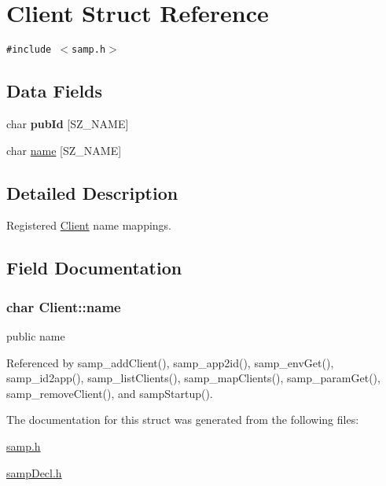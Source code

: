 \hypertarget{structClient}{
\section{Client Struct Reference}
\label{structClient}
}
{\tt \#include $<$samp.h$>$}

\subsection*{Data Fields}
\begin{CompactItemize}
\item 
\hypertarget{structClient_69ad045aad8793b0aa0984e245e549eb}{
char \textbf{pubId} \mbox{[}SZ\_\-NAME\mbox{]}}
\label{structClient_69ad045aad8793b0aa0984e245e549eb}

\item 
char \hyperlink{structClient_67f4b49f5eda3f6cf1ff33a6fe883bf6}{name} \mbox{[}SZ\_\-NAME\mbox{]}
\end{CompactItemize}


\subsection{Detailed Description}
Registered \hyperlink{structClient}{Client} name mappings. 

\subsection{Field Documentation}
\hypertarget{structClient_67f4b49f5eda3f6cf1ff33a6fe883bf6}{
\subsubsection[{name}]{\setlength{\rightskip}{0pt plus 5cm}char {\bf Client::name}}}
\label{structClient_67f4b49f5eda3f6cf1ff33a6fe883bf6}


public name 

Referenced by samp\_\-addClient(), samp\_\-app2id(), samp\_\-envGet(), samp\_\-id2app(), samp\_\-listClients(), samp\_\-mapClients(), samp\_\-paramGet(), samp\_\-removeClient(), and sampStartup().

The documentation for this struct was generated from the following files:\begin{CompactItemize}
\item 
\hyperlink{samp_8h}{samp.h}\item 
\hyperlink{sampDecl_8h}{sampDecl.h}\end{CompactItemize}
